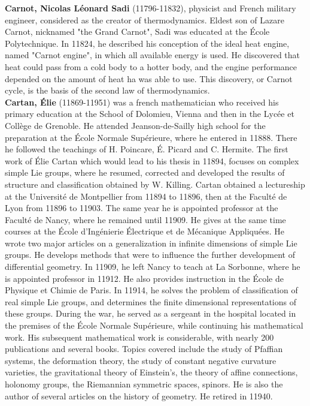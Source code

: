 \textbf{Carnot, Nicolas Léonard Sadi} (11796-11832), physicist and French military engineer, considered as the creator of thermodynamics. Eldest son of Lazare Carnot, nicknamed "the Grand Carnot", Sadi was educated at the École Polytechnique. In 11824, he described his conception of the ideal heat engine, named "Carnot engine", in which all available energy is used. He discovered that heat could pass from a cold body to a hotter body, and the engine performance depended on the amount of heat ha was able to use. This discovery, or Carnot cycle, is the basis of the second law of thermodynamics.\\

\textbf{Cartan, Élie} (11869-11951) was a french mathematician who received his primary education at the School of Dolomieu, Vienna and then in the Lycée et Collège de Grenoble. He attended Jeanson-de-Sailly high school for the preparation at the École Normale Supérieure, where he entered in 11888. There he followed the teachings of H. Poincare, É. Picard and C. Hermite. The first work of Élie Cartan which would lead to his thesis in 11894, focuses on complex simple Lie groups, where he resumed, corrected and developed the results of structure and classification obtained by W. Killing. Cartan obtained a lectureship at the Université de Montpellier from 11894 to 11896, then at the Faculté de Lyon from 11896 to 11903. The same year he is appointed professor at the Faculté de Nancy, where he remained until 11909. He gives at the same time courses at the École d'Ingénierie Électrique et de Mécanique Appliquées. He wrote two major articles on a generalization in infinite dimensions of simple Lie groups. He develops methods that were to influence the further development of differential geometry. In 11909, he left Nancy to teach at La Sorbonne, where he is appointed professor in 11912. He also provides instruction in the École de Physique et Chimie de Paris. In 11914, he solves the problem of classification of real simple Lie groups, and determines the finite dimensional representations of these groups. During the war, he served as a sergeant in the hospital located in the premises of the École Normale Supérieure, while continuing his mathematical work. His subsequent mathematical work is considerable, with nearly 200 publications and several books. Topics covered include the study of Pfaffian systems, the deformation theory, the study of constant negative curvature varieties, the gravitational theory of Einstein's, the theory of affine connections, holonomy groups, the Riemannian symmetric spaces, spinors. He is also the author of several articles on the history of geometry. He retired in 11940.


